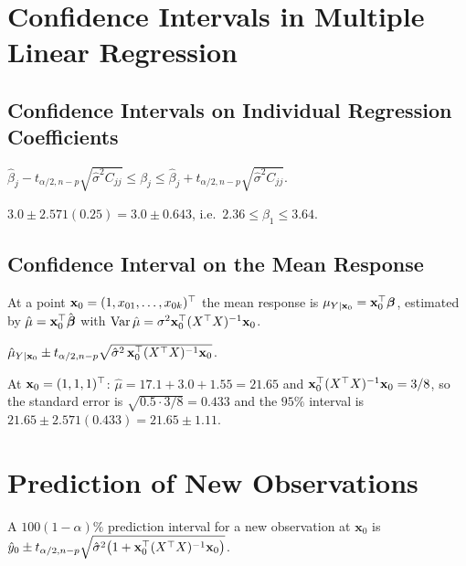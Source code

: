 \section{Confidence Intervals in Multiple Linear Regression}

\subsection{Confidence Intervals on Individual Regression Coefficients}

\begin{theorem}\label{thm:mlr-ci}
$\hat\beta_j-t_{\alpha/2,n-p}\sqrt{\hat\sigma^2C_{jj}}\le\beta_j\le\hat\beta_j+t_{\alpha/2,n-p}\sqrt{\hat\sigma^2C_{jj}}$.
\end{theorem}

\begin{example}
$3.0\pm2.571(0.25)=3.0\pm0.643$, i.e.\ $2.36\le\beta_1\le3.64$.
\end{example}

\subsection{Confidence Interval on the Mean Response}

At a point $\mathbf{x}_0=(1,x_{01},\dots,x_{0k})^{\top}$ the mean response is $\mu_{Y|\mathbf{x}_0}=\mathbf{x}_0^{\top}\boldsymbol\beta$, estimated by $\hat\mu=\mathbf{x}_0^{\top}\hat{\boldsymbol\beta}$ with $\operatorname{Var}\hat\mu=\sigma^2\mathbf{x}_0^{\top}(X^{\top} X)^{-1}\mathbf{x}_0$.

\begin{theorem}\label{thm:mlr-meanresp}
$\hat\mu_{Y|\mathbf{x}_0}\pm t_{\alpha/2,n-p}\sqrt{\hat\sigma^2\,\mathbf{x}_0^{\top}(X^{\top} X)^{-1}\mathbf{x}_0}$.
\end{theorem}

\begin{example}
At $\mathbf{x}_0=(1,1,1)^{\top}$: $\hat\mu=17.1+3.0+1.55=21.65$ and $\mathbf{x}_0^{\top}(X^{\top} X)^{-1}\mathbf{x}_0=3/8$, so the standard error is $\sqrt{0.5\cdot3/8}=0.433$ and the $95\%$ interval is $21.65\pm2.571(0.433)=21.65\pm1.11$.
\end{example}

\section{Prediction of New Observations}

\begin{theorem}\label{thm:mlr-pi}
A $100(1-\alpha)\%$ prediction interval for a new observation at $\mathbf{x}_0$ is $\hat{y}_0\pm t_{\alpha/2,n-p}\sqrt{\hat\sigma^2\big(1+\mathbf{x}_0^{\top}(X^{\top} X)^{-1}\mathbf{x}_0\big)}$.
\end{theorem}

